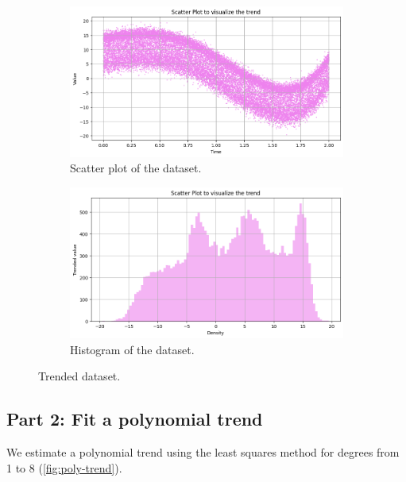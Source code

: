 \documentclass[a4paper]{article}
\begin{document}
\begin{figure}[htbp]
  \centering
  \begin{subfigure}[t]{0.4\textwidth}
    \centering
    \includegraphics[width=\textwidth]{images/trended_scatter.png}
    \caption{Scatter plot of the dataset.}\label{fig:trend-scatter}
  \end{subfigure}
  \hfill
  \begin{subfigure}[t]{0.4\textwidth}
    \centering
    \includegraphics[width=\textwidth]{images/trended_dist.png}
    \caption{Histogram of the dataset.}\label{fig:trend-hist}
  \end{subfigure}
  \caption{Trended dataset.}\label{fig:trend}
\end{figure}

\subsection*{Part 2: Fit a polynomial trend}

We estimate a polynomial trend using the least squares method for degrees from 1 to 8 (\ref{fig:poly-trend}).
\end{document}
